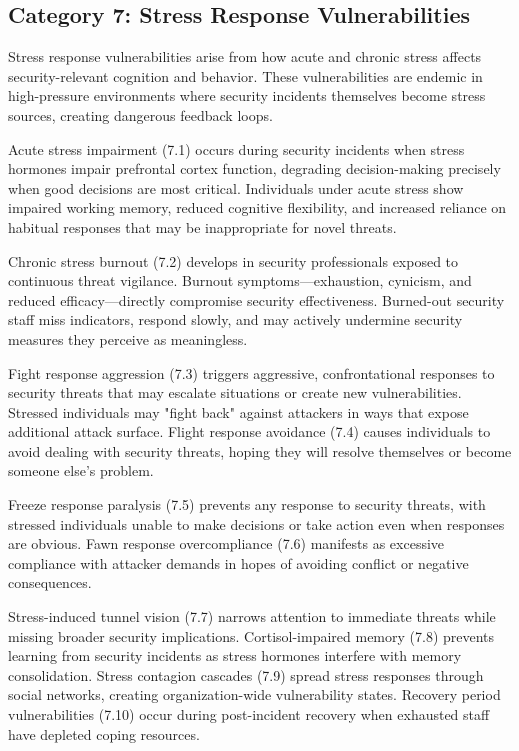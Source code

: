 \documentclass[manuscript,screen,review]{acmart}
\begin{document}
\subsection{Category 7: Stress Response Vulnerabilities}

Stress response vulnerabilities arise from how acute and chronic stress affects security-relevant cognition and behavior. These vulnerabilities are endemic in high-pressure environments where security incidents themselves become stress sources, creating dangerous feedback loops.

Acute stress impairment (7.1) occurs during security incidents when stress hormones impair prefrontal cortex function, degrading decision-making precisely when good decisions are most critical. Individuals under acute stress show impaired working memory, reduced cognitive flexibility, and increased reliance on habitual responses that may be inappropriate for novel threats.

Chronic stress burnout (7.2) develops in security professionals exposed to continuous threat vigilance. Burnout symptoms—exhaustion, cynicism, and reduced efficacy—directly compromise security effectiveness. Burned-out security staff miss indicators, respond slowly, and may actively undermine security measures they perceive as meaningless.

Fight response aggression (7.3) triggers aggressive, confrontational responses to security threats that may escalate situations or create new vulnerabilities. Stressed individuals may "fight back" against attackers in ways that expose additional attack surface. Flight response avoidance (7.4) causes individuals to avoid dealing with security threats, hoping they will resolve themselves or become someone else's problem.

Freeze response paralysis (7.5) prevents any response to security threats, with stressed individuals unable to make decisions or take action even when responses are obvious. Fawn response overcompliance (7.6) manifests as excessive compliance with attacker demands in hopes of avoiding conflict or negative consequences.

Stress-induced tunnel vision (7.7) narrows attention to immediate threats while missing broader security implications. Cortisol-impaired memory (7.8) prevents learning from security incidents as stress hormones interfere with memory consolidation. Stress contagion cascades (7.9) spread stress responses through social networks, creating organization-wide vulnerability states. Recovery period vulnerabilities (7.10) occur during post-incident recovery when exhausted staff have depleted coping resources.
\end{document}
